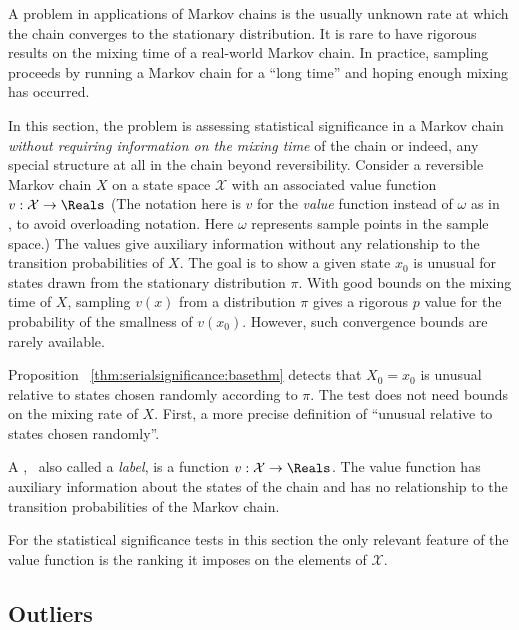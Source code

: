 \documentclass[12pt]{article}
\begin{document}
A problem in applications of Markov chains is the usually unknown rate
at which the chain converges to the stationary distribution.  It is rare
to have rigorous results on the mixing time of a real-world Markov
chain.  In practice, sampling proceeds by running a Markov chain for a
``long time'' and hoping enough mixing has occurred.

In this section, the problem is assessing statistical significance in a
Markov chain \emph{without requiring information on the mixing time} of
the chain or indeed, any special structure at all in the chain beyond
reversibility.  Consider a reversible Markov chain \( X \) on a state
space \( \mathcal{X} \) with an associated value function \( v :
\mathcal{X} \to \Reals \) (The notation here is \( v \) for the \emph{value}
function instead of \( \omega \) as in~%
\cite{Chikina2860}, to avoid overloading notation.  Here \( \omega \)
represents sample points in the sample space.) The values give auxiliary
information without any relationship to the transition probabilities of \(
X \).  The goal is to show a given state \( x_0 \) is unusual for states
drawn from the stationary distribution \( \pi \).  With good bounds on
the mixing time of \( X \), sampling \( v(x) \) from a distribution \(
\pi \) gives a rigorous \( p \) value for the probability of the
smallness of \( v(x_0) \).  However, such convergence bounds are rarely
available.

Proposition~%
\ref{thm:serialsignificance:basethm} detects that \( X_0 = x_0 \) is
unusual relative to states chosen randomly according to \( \pi \).  The
test does not need bounds on the mixing rate of \( X \).  First, a more
precise definition of ``unusual relative to states chosen randomly''.

\begin{definition}
    A ,~%
    also called a \emph{label}, is a function \( v :  \mathcal{X} \to
    \Reals \).  The value function has auxiliary information about the
    states of the chain and has no relationship to the transition
    probabilities of the Markov chain.
\end{definition}

\begin{remark}
    For the statistical significance tests in this section the only
    relevant feature of the value function is the ranking it imposes on
    the elements of \( \mathcal{X} \).
\end{remark}

\subsection*{Outliers}
\end{document}
